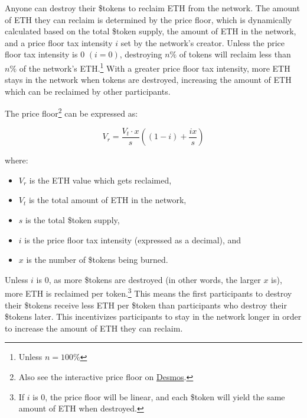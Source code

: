 \documentclass{article}
\begin{document}
Anyone can destroy their \$tokens to reclaim ETH from the network. The amount of ETH they can reclaim is determined by the price floor, which is dynamically calculated based on the total \$token supply, the amount of ETH in the network, and a price floor tax intensity $i$ set by the network's creator. Unless the price floor tax intensity is 0 $(i = 0)$, destroying $n\%$ of tokens will reclaim less than $n\%$ of the network's ETH.\footnote{Unless $n = 100\%$} With a greater price floor tax intensity, more ETH stays in the network when tokens are destroyed, increasing the amount of ETH which can be reclaimed by other participants.

The price floor\footnote{Also see the interactive price floor on \href{https://www.desmos.com/calculator/9pewqesyj5}{Desmos}.} can be expressed as:

\begin{equation}
  V_r = \frac{V_t \cdot x}{s}\left(\left(1-i\right)+\frac{ix}{s}\right)
\end{equation}

where:
\begin{itemize}
  \item $V_r$ is the ETH value which gets reclaimed,
  \item $V_t$ is the total amount of ETH in the network,
  \item $s$ is the total \$token supply,
  \item $i$ is the price floor tax intensity (expressed as a decimal), and
  \item $x$ is the number of \$tokens being burned.
\end{itemize}

Unless $i$ is 0, as more \$tokens are destroyed (in other words, the larger $x$ is), more ETH is reclaimed per token.\footnote{If $i$ is 0, the price floor will be linear, and each \$token will yield the same amount of ETH when destroyed.} This means the first participants to destroy their \$tokens receive less ETH per \$token than participants who destroy their \$tokens later. This incentivizes participants to stay in the network longer in order to increase the amount of ETH they can reclaim.
\end{document}
